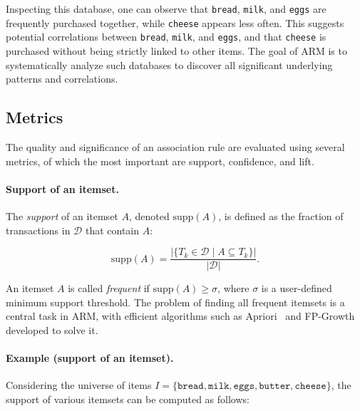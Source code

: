 Inspecting this database, one can observe that \texttt{bread}, \texttt{milk}, and \texttt{eggs} are frequently purchased together, while \texttt{cheese} appears less often. This suggests potential correlations between \texttt{bread}, \texttt{milk}, and \texttt{eggs}, and that \texttt{cheese} is purchased without being strictly linked to other items. The goal of ARM is to systematically analyze such databases to discover all significant underlying patterns and correlations.

\subsection{Metrics}

The quality and significance of an association rule are evaluated using several metrics, of which the most important are support, confidence, and lift.

\paragraph{Support of an itemset.} The \emph{support} of an itemset $A$, denoted $\mathrm{supp}(A)$, is defined as the fraction of transactions in $\mathcal{D}$ that contain $A$:

\begin{equation}
  \mathrm{supp}(A) = \frac{|\{T_k \in \mathcal{D} \mid A \subseteq T_k\}|}{|\mathcal{D}|}.
\end{equation}

An itemset $A$ is called \emph{frequent} if $\mathrm{supp}(A) \geq \sigma$, where $\sigma$ is a user-defined minimum support threshold. The problem of finding all frequent itemsets is a central task in ARM, with efficient algorithms such as Apriori~\cite{agrawal1994fast} and FP-Growth~\cite{han2000mining} developed to solve it.

\paragraph{Example (support of an itemset).} Considering the universe of items $I = \{\texttt{bread}, \texttt{milk}, \texttt{eggs}, \texttt{butter}, \texttt{cheese}\}$, the support of various itemsets can be computed as follows:

